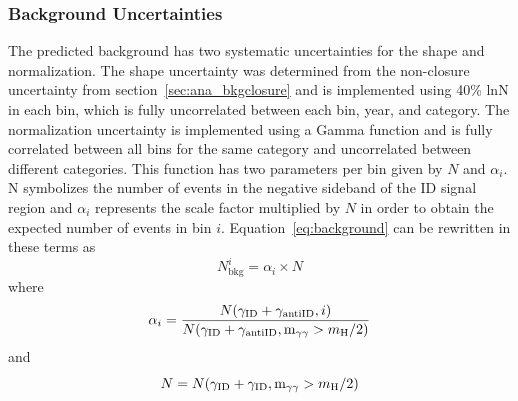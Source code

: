 \subsubsection{Background Uncertainties} \label{sec:ana_systs_bkg}
The predicted background has two systematic uncertainties for the shape and normalization. The shape uncertainty was determined from the non-closure uncertainty from section~\ref{sec:ana_bkgclosure} and is implemented using 40\% lnN in each bin, which is fully uncorrelated between each bin, year, and category. The normalization uncertainty is implemented using a Gamma function and is fully correlated between all bins for the same category and uncorrelated between different categories. This function has two parameters per bin given by $N$ and $\alpha_i$. N symbolizes the number of events in the negative \lxy sideband of the ID signal region and $\alpha_i$ represents the scale factor multiplied by $N$ in order to obtain the expected number of events in bin $i$. Equation~\ref{eq:background} can be rewritten in these terms as
\begin{equation}
	N_\text{bkg}^i=\alpha_i\times N
\end{equation}
where
\begin{equation}
	\alpha_i=\frac{N(\gamma_\mathrm{ID}+\gamma_\mathrm{antiID}, i)}{N(\gamma_\mathrm{ID}+\gamma_\mathrm{antiID}, \text{m}_{\gamma\gamma} > m_{\mathrm{H}}\space/2)}
\end{equation}
and
\begin{equation}
	N=N(\gamma_\mathrm{ID}+\gamma_\mathrm{ID}, \text{m}_{\gamma\gamma} > m_{\mathrm{H}}\space/2)
\end{equation}

